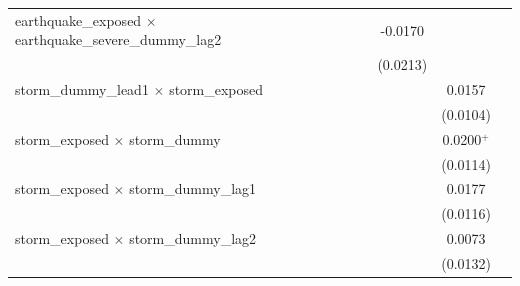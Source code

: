 \begin{tabular}{lcccccccc}
   earthquake\_exposed $\times$ earthquake\_severe\_dummy\_lag2       &                       &                       &                       &                       &                       & -0.0170               &                       &   \\   
                                                                      &                       &                       &                       &                       &                       & (0.0213)              &                       &   \\   
   storm\_dummy\_lead1 $\times$ storm\_exposed                        &                       &                       &                       &                       &                       &                       & 0.0157                &   \\   
                                                                      &                       &                       &                       &                       &                       &                       & (0.0104)              &   \\   
   storm\_exposed $\times$ storm\_dummy                               &                       &                       &                       &                       &                       &                       & 0.0200$^{+}$          &   \\   
                                                                      &                       &                       &                       &                       &                       &                       & (0.0114)              &   \\   
   storm\_exposed $\times$ storm\_dummy\_lag1                         &                       &                       &                       &                       &                       &                       & 0.0177                &   \\   
                                                                      &                       &                       &                       &                       &                       &                       & (0.0116)              &   \\   
   storm\_exposed $\times$ storm\_dummy\_lag2                         &                       &                       &                       &                       &                       &                       & 0.0073                &   \\   
                                                                      &                       &                       &                       &                       &                       &                       & (0.0132)              &   \\   

\end{tabular}
